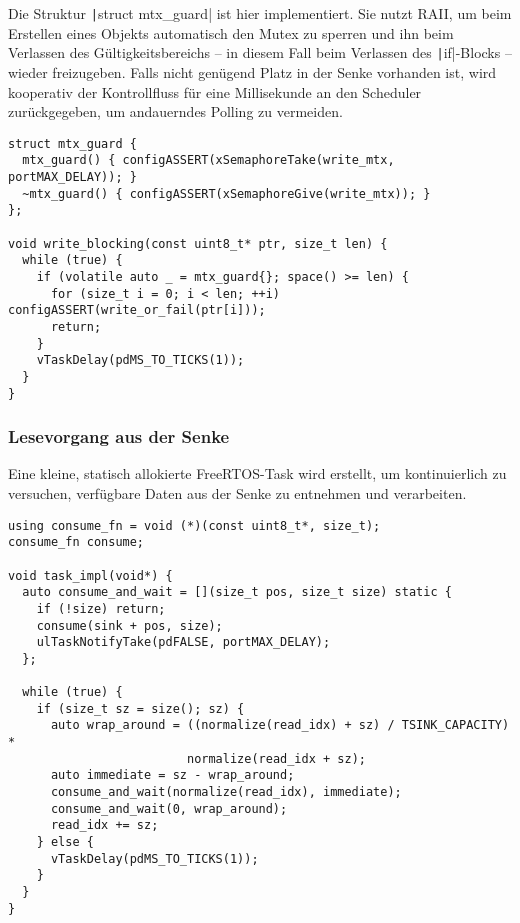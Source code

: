 Die Struktur \texttt|struct mtx_guard| ist hier implementiert. Sie
nutzt \ac{RAII}, um beim Erstellen eines Objekts automatisch den Mutex zu
sperren und ihn beim Verlassen des Gültigkeitsbereichs -- in diesem Fall beim
Verlassen des \texttt|if|-Blocks -- wieder freizugeben. Falls nicht
genügend Platz in der Senke vorhanden ist, wird kooperativ der Kontrollfluss für
eine Millisekunde an den Scheduler zurückgegeben, um andauerndes Polling zu
vermeiden.

\begin{code}
\begin{verbatim}
struct mtx_guard {
  mtx_guard() { configASSERT(xSemaphoreTake(write_mtx, portMAX_DELAY)); }
  ~mtx_guard() { configASSERT(xSemaphoreGive(write_mtx)); }
};

void write_blocking(const uint8_t* ptr, size_t len) {
  while (true) {
    if (volatile auto _ = mtx_guard{}; space() >= len) {
      for (size_t i = 0; i < len; ++i) configASSERT(write_or_fail(ptr[i]));
      return;
    }
    vTaskDelay(pdMS_TO_TICKS(1));
  }
}
\end{verbatim}
\end{code}

\subsubsection{Lesevorgang aus der Senke}

Eine kleine, statisch allokierte FreeRTOS-Task wird erstellt, um kontinuierlich
zu versuchen, verfügbare Daten aus der Senke zu entnehmen und verarbeiten.

\begin{code}
\begin{verbatim}
using consume_fn = void (*)(const uint8_t*, size_t);
consume_fn consume;

void task_impl(void*) {
  auto consume_and_wait = [](size_t pos, size_t size) static {
    if (!size) return;
    consume(sink + pos, size);
    ulTaskNotifyTake(pdFALSE, portMAX_DELAY);
  };

  while (true) {
    if (size_t sz = size(); sz) {
      auto wrap_around = ((normalize(read_idx) + sz) / TSINK_CAPACITY) *
                         normalize(read_idx + sz);
      auto immediate = sz - wrap_around;
      consume_and_wait(normalize(read_idx), immediate);
      consume_and_wait(0, wrap_around);
      read_idx += sz;
    } else {
      vTaskDelay(pdMS_TO_TICKS(1));
    }
  }
}
\end{verbatim}
\end{code}


